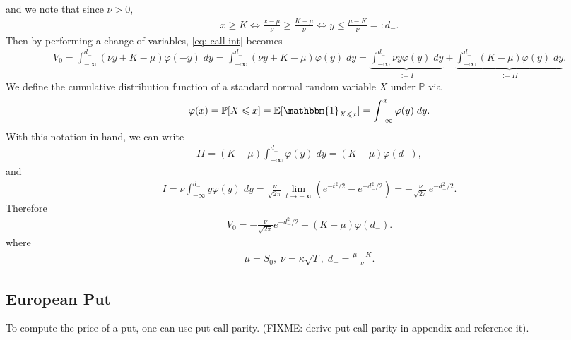 \documentclass[reqno]{amsart}
\begin{document}
and we note that since $\nu > 0$, 
\begin{align}
	 x \ge K \Longleftrightarrow \frac{x-\mu}{\nu} \ge \frac{K - \mu}{\nu} \Longleftrightarrow y \le \frac{\mu - K}{\nu} =: d_-.
\end{align}
Then by performing a change of variables, \eqref{eq: call int} becomes 
\begin{align}
	 V_0 = \int_{-\infty}^{d_-} (\nu y + K - \mu) \varphi(-y) \; dy = \int_{-\infty}^{d_-} (\nu y + K - \mu) \varphi(y) \; dy = \underbrace{\int_{-\infty}^{d_-} \nu y \varphi(y) \; dy}_{:= I} + \underbrace{\int_{-\infty}^{d_-}  (K-\mu)\varphi(y) \; dy}_{:= II}.
\end{align}
We define the cumulative distribution function of a standard normal random variable $X$ under $\mathbb{P}$ via 
\begin{align}
	 \varphi(x) = \mathbb{P}[X \le x] = \E[ \mathbbm{1}_{X \le x}] = \int_{-\infty}^x \varphi(y) \; dy.
\end{align}
With this notation in hand, we can write 
\begin{align}
	 II = (K-\mu) \int_{-\infty}^{d_-} \varphi(y) \; dy = (K-\mu) \varphi(d_-),
\end{align}
and 
\begin{align}
	 I = \nu \int_{-\infty}^{d_-} y \varphi(y) \; dy =  \frac{\nu}{\sqrt{2\pi}} \lim_{t \to -\infty} (e^{-t^2/2} - e^{-d_-^2/2}) = -\frac{\nu}{\sqrt{2\pi}} e^{-d_-^2/2}.
\end{align}
Therefore 
\begin{align}
	 V_0 =  -\frac{\nu}{\sqrt{2\pi}} e^{-d_-^2/2} + (K-\mu) \varphi(d_-).
\end{align}
where 
\begin{align}
	 \mu = S_0, \; \nu = \kappa \sqrt{T}, \; d_- = \frac{\mu - K}{\nu}.
\end{align}

\subsection{European Put}
To compute the price of a put, one can use put-call parity.
(FIXME: derive put-call parity in appendix and reference it). 
\end{document}
